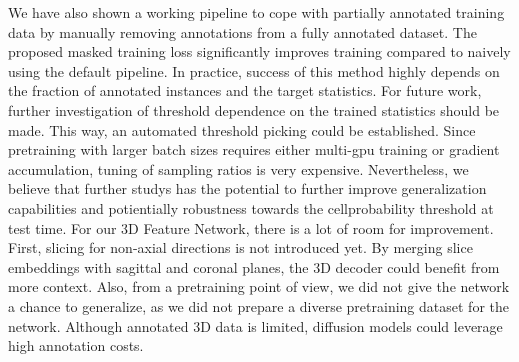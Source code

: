 We have also shown a working pipeline to cope with partially annotated training data by manually removing annotations from a fully annotated dataset. The proposed masked training loss significantly improves training compared to naively using the default pipeline. In practice, success of this method highly depends on the fraction of annotated instances and the target statistics.
For future work, further investigation of threshold dependence on the trained statistics should be made. This way, an automated threshold picking could be established. Since pretraining with larger batch sizes requires either multi-gpu training or gradient accumulation, tuning of sampling ratios is very expensive. Nevertheless, we believe that further studys has the potential to further improve generalization capabilities and potientially robustness towards the cellprobability threshold at test time. 
For our 3D Feature Network, there is a lot of room for improvement. First, slicing for non-axial directions is not introduced yet. By merging slice embeddings with sagittal and coronal planes, the 3D decoder could benefit from more context. Also, from a pretraining point of view, we did not give the network a chance to generalize, as we did not prepare a diverse pretraining dataset for the network. Although annotated 3D data is limited, diffusion models could leverage high annotation costs.